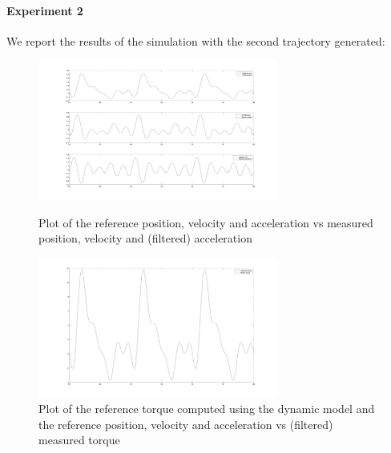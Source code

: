 \documentclass{article}
\begin{document}
\paragraph{Experiment 2}
We report the results of the simulation with the second trajectory generated:
\begin{figure}[!htbp]
\centering
\includegraphics[width=0.7\textwidth]{images/1-dof/experiment2_traj.png}
\caption{Plot of the reference position, velocity and acceleration vs measured position, velocity and (filtered) acceleration}
\includegraphics[width=0.7\textwidth]{images/1-dof/experiment2.png}
\caption{Plot of the reference torque computed using the dynamic model and the reference position, velocity and acceleration vs (filtered) measured torque}
\end{figure}
\pagebreak
\end{document}
